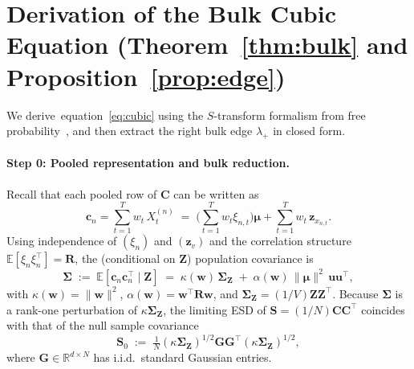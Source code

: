 \documentclass{article}
\def\eqref#1{equation~\ref{#1}}
\def\vmu{{\bm{\mu}}}
\def\vc{{\bm{c}}}
\def\vu{{\bm{u}}}
\def\vw{{\bm{w}}}
\def\vz{{\bm{z}}}
\def\mC{{\bm{C}}}
\def\mG{{\bm{G}}}
\def\mR{{\bm{R}}}
\def\mS{{\bm{S}}}
\def\mZ{{\bm{Z}}}
\def\mSigma{{\bm{\Sigma}}}
\def\sR{{\mathbb{R}}}
\newcommand{\E}{\mathbb{E}}
\begin{document}





\newpage
\appendix

\section{Derivation of the Bulk Cubic Equation (Theorem~\ref{thm:bulk} and Proposition~\ref{prop:edge})}\label{app:cubic}

We derive~\eqref{eq:cubic} using the $S$-transform formalism from free probability~\citep{nica2006lectures}, and then extract the right bulk edge $\lambda_+$ in closed form.

\paragraph{Step 0: Pooled representation and bulk reduction.}
Recall that each pooled row of $\mC$ can be written as
\[
    \vc_n = \sum_{t=1}^T w_t\, X_t^{(n)}
    \;=\; \Big(\sum_{t=1}^T w_t \xi_{n,t}\Big)\vmu + \sum_{t=1}^T w_t\,\vz_{x_{n,t}}.
\]
Using independence of $(\xi_n)$ and $(\vz_v)$ and the correlation structure $\E[\xi_n\xi_n^\top]=\mR$, the (conditional on $\mZ$) population covariance is
\begin{equation}\label{eq:Sigma_pop_app}
    \mSigma \;:=\; \E[\vc_n\vc_n^\top\mid \mZ]
    \;=\; \kappa(\vw)\,\mSigma_\mZ \;+\; \alpha(\vw)\,\|\vmu\|^2\,\vu\vu^\top,
\end{equation}
with $\kappa(\vw)=\|\vw\|^2$, $\alpha(\vw)=\vw^\top\mR\vw$, and $\mSigma_\mZ=(1/V)\mZ\mZ^\top$.
Because $\mSigma$ is a rank-one perturbation of $\kappa\mSigma_\mZ$, the limiting ESD of $\mS=(1/N)\mC\mC^\top$ coincides with that of the null sample covariance
\[
    \mS_0 \;:=\; \tfrac{1}{N}(\kappa\mSigma_\mZ)^{1/2}\mG\mG^\top(\kappa\mSigma_\mZ)^{1/2},
\]
where $\mG\in\sR^{d\times N}$ has i.i.d.\ standard Gaussian entries.
\end{document}
